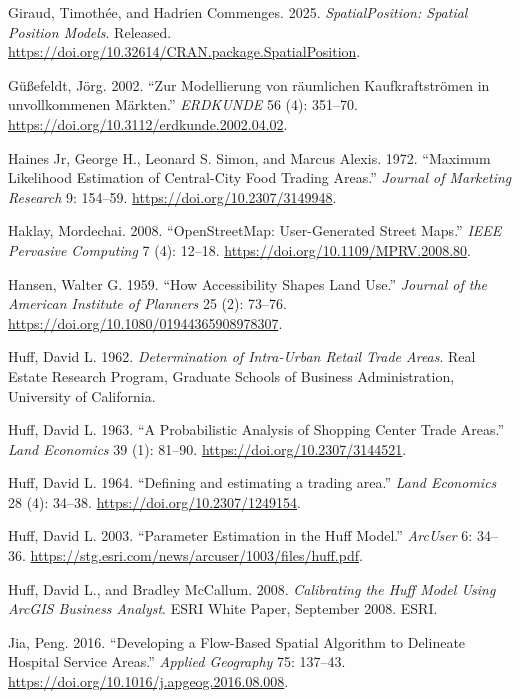 \documentclass[
]{article}
\newlength{\cslhangindent}
\newenvironment{CSLReferences}[2] %
 {\begin{list}{}{%
  \setlength{\itemindent}{0pt}
  \setlength{\leftmargin}{0pt}
  \setlength{\parsep}{0pt}
  \ifodd #1
   \setlength{\leftmargin}{\cslhangindent}
   \setlength{\itemindent}{-1\cslhangindent}
  \fi
  \setlength{\itemsep}{#2\baselineskip}}}
 {\end{list}}
\begin{document}
\begin{CSLReferences}{1}{1}
Giraud, Timothée, and Hadrien Commenges. 2025. \emph{SpatialPosition:
Spatial Position Models}. Released.
\url{https://doi.org/10.32614/CRAN.package.SpatialPosition}.

Güßefeldt, Jörg. 2002. {``{Zur Modellierung von räumlichen
Kaufkraftströmen in unvollkommenen Märkten}.''} \emph{ERDKUNDE} 56 (4):
351--70. \url{https://doi.org/10.3112/erdkunde.2002.04.02}.

Haines Jr, George H., Leonard S. Simon, and Marcus Alexis. 1972.
{``{Maximum Likelihood Estimation of Central-City Food Trading
Areas}.''} \emph{Journal of Marketing Research} 9: 154--59.
\url{https://doi.org/10.2307/3149948}.

Haklay, Mordechai. 2008. {``OpenStreetMap: User-Generated Street
Maps.''} \emph{IEEE Pervasive Computing} 7 (4): 12--18.
\url{https://doi.org/10.1109/MPRV.2008.80}.

Hansen, Walter G. 1959. {``{How Accessibility Shapes Land Use}.''}
\emph{Journal of the American Institute of Planners} 25 (2): 73--76.
\url{https://doi.org/10.1080/01944365908978307}.

Huff, David L. 1962. \emph{{Determination of Intra-Urban Retail Trade
Areas}}. Real Estate Research Program, Graduate Schools of Business
Administration, University of California.

Huff, David L. 1963. {``{A Probabilistic Analysis of Shopping Center
Trade Areas}.''} \emph{Land Economics} 39 (1): 81--90.
\url{https://doi.org/10.2307/3144521}.

Huff, David L. 1964. {``{Defining and estimating a trading area}.''}
\emph{Land Economics} 28 (4): 34--38.
\url{https://doi.org/10.2307/1249154}.

Huff, David L. 2003. {``{Parameter Estimation in the Huff Model}.''}
\emph{ArcUser} 6: 34--36.
\url{https://stg.esri.com/news/arcuser/1003/files/huff.pdf}.

Huff, David L., and Bradley McCallum. 2008. \emph{{Calibrating the Huff
Model Using ArcGIS Business Analyst}}. ESRI White Paper, September 2008.
ESRI.

Jia, Peng. 2016. {``Developing a Flow-Based Spatial Algorithm to
Delineate Hospital Service Areas.''} \emph{Applied Geography} 75:
137--43. \url{https://doi.org/10.1016/j.apgeog.2016.08.008}.


\end{CSLReferences}
\end{document}

